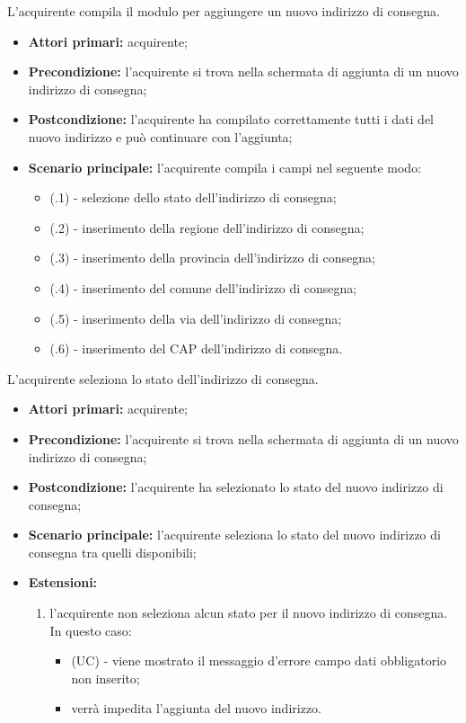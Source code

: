 L'acquirente compila il modulo per aggiungere un nuovo indirizzo di consegna.
\begin{itemize}
	\item \textbf{Attori primari:} acquirente;
	\item \textbf{Precondizione:} l'acquirente si trova nella schermata di aggiunta di un nuovo indirizzo di consegna;
	\item \textbf{Postcondizione:} l'acquirente ha compilato correttamente tutti i dati del nuovo indirizzo e può continuare con l'aggiunta;
	\item \textbf{Scenario principale:} l'acquirente compila i campi nel seguente modo:
	\begin{itemize}
		\item (\actualSubUC.1) - selezione dello stato dell'indirizzo di consegna;
		\item (\actualSubUC.2) - inserimento della regione dell'indirizzo di consegna;
		\item (\actualSubUC.3) - inserimento della provincia dell'indirizzo di consegna;
		\item (\actualSubUC.4) - inserimento del comune dell'indirizzo di consegna;
		\item (\actualSubUC.5) - inserimento della via dell'indirizzo di consegna;
		\item (\actualSubUC.6) - inserimento del CAP dell'indirizzo di consegna.
	\end{itemize}
\end{itemize}

\resetSubSubUC

L'acquirente seleziona lo stato dell'indirizzo di consegna.
\begin{itemize}
    \item \textbf{Attori primari:} acquirente;
    \item \textbf{Precondizione:} l'acquirente si trova nella schermata di aggiunta di un nuovo indirizzo di consegna;
    \item \textbf{Postcondizione:} l'acquirente ha selezionato lo stato del nuovo indirizzo di consegna;
    \item \textbf{Scenario principale:} l'acquirente seleziona lo stato del nuovo indirizzo di consegna tra quelli disponibili;
    \item \textbf{Estensioni:}
    \begin{enumerate}[label=\lett]
        \item l'acquirente non seleziona alcun stato per il nuovo indirizzo di consegna. In questo caso:
        \begin{itemize}
            \item (UC) - viene mostrato il messaggio d'errore campo dati obbligatorio non inserito;
            \item verrà impedita l'aggiunta del nuovo indirizzo.
        \end{itemize}
    \end{enumerate}
\end{itemize}

